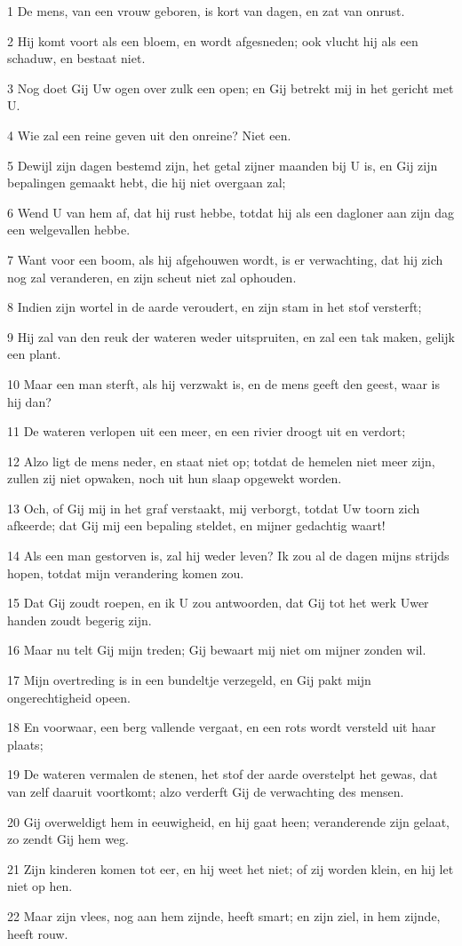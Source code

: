 \par 1 De mens, van een vrouw geboren, is kort van dagen, en zat van onrust.
\par 2 Hij komt voort als een bloem, en wordt afgesneden; ook vlucht hij als een schaduw, en bestaat niet.
\par 3 Nog doet Gij Uw ogen over zulk een open; en Gij betrekt mij in het gericht met U.
\par 4 Wie zal een reine geven uit den onreine? Niet een.
\par 5 Dewijl zijn dagen bestemd zijn, het getal zijner maanden bij U is, en Gij zijn bepalingen gemaakt hebt, die hij niet overgaan zal;
\par 6 Wend U van hem af, dat hij rust hebbe, totdat hij als een dagloner aan zijn dag een welgevallen hebbe.
\par 7 Want voor een boom, als hij afgehouwen wordt, is er verwachting, dat hij zich nog zal veranderen, en zijn scheut niet zal ophouden.
\par 8 Indien zijn wortel in de aarde veroudert, en zijn stam in het stof versterft;
\par 9 Hij zal van den reuk der wateren weder uitspruiten, en zal een tak maken, gelijk een plant.
\par 10 Maar een man sterft, als hij verzwakt is, en de mens geeft den geest, waar is hij dan?
\par 11 De wateren verlopen uit een meer, en een rivier droogt uit en verdort;
\par 12 Alzo ligt de mens neder, en staat niet op; totdat de hemelen niet meer zijn, zullen zij niet opwaken, noch uit hun slaap opgewekt worden.
\par 13 Och, of Gij mij in het graf verstaakt, mij verborgt, totdat Uw toorn zich afkeerde; dat Gij mij een bepaling steldet, en mijner gedachtig waart!
\par 14 Als een man gestorven is, zal hij weder leven? Ik zou al de dagen mijns strijds hopen, totdat mijn verandering komen zou.
\par 15 Dat Gij zoudt roepen, en ik U zou antwoorden, dat Gij tot het werk Uwer handen zoudt begerig zijn.
\par 16 Maar nu telt Gij mijn treden; Gij bewaart mij niet om mijner zonden wil.
\par 17 Mijn overtreding is in een bundeltje verzegeld, en Gij pakt mijn ongerechtigheid opeen.
\par 18 En voorwaar, een berg vallende vergaat, en een rots wordt versteld uit haar plaats;
\par 19 De wateren vermalen de stenen, het stof der aarde overstelpt het gewas, dat van zelf daaruit voortkomt; alzo verderft Gij de verwachting des mensen.
\par 20 Gij overweldigt hem in eeuwigheid, en hij gaat heen; veranderende zijn gelaat, zo zendt Gij hem weg.
\par 21 Zijn kinderen komen tot eer, en hij weet het niet; of zij worden klein, en hij let niet op hen.
\par 22 Maar zijn vlees, nog aan hem zijnde, heeft smart; en zijn ziel, in hem zijnde, heeft rouw.

